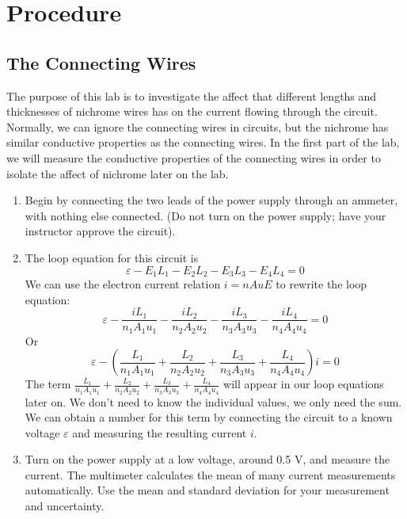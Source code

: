 \documentclass[12pt]{article}
\begin{document}
	\section*{Procedure}
		\subsection*{The Connecting Wires}
		The purpose of this lab is to investigate the affect that different lengths and thicknesses of nichrome wires has on the current flowing through the circuit. Normally, we can ignore the connecting wires in circuits, but the nichrome has similar conductive properties as the connecting wires. In the first part of the lab, we will measure the conductive properties of the connecting wires in order to isolate the affect of nichrome later on the lab.
		\begin{enumerate}
			\item Begin by connecting the two leads of the power supply through an ammeter, with nothing else connected. (Do not turn on the power supply; have your instructor approve the circuit).
			\item The loop equation for this circuit is
			\begin{equation*}
				\varepsilon-E_1L_1-E_2L_2-E_3L_3-E_4L_4=0
			\end{equation*}
			We can use the electron current relation $i=nAuE$ to rewrite the loop equation:
			\begin{equation*}
				\varepsilon-\frac{iL_1}{n_1A_1u_1}-\frac{iL_2}{n_2A_2u_2}-\frac{iL_3}{n_3A_3u_3}-\frac{iL_4}{n_4A_4u_4}=0
			\end{equation*}
			Or
			\begin{equation}
				\varepsilon - \left(\frac{L_1}{n_1A_1u_1}+\frac{L_2}{n_2A_2u_2}+\frac{L_3}{n_3A_3u_3}+\frac{L_4}{n_4A_4u_4}\right)i=0
				\label{eqn1}
			\end{equation}
			The term $\frac{L_1}{n_1A_1u_1}+\frac{L_2}{n_2A_2u_2}+\frac{L_3}{n_3A_3u_3}+\frac{L_4}{n_4A_4u_4}$ will appear in our loop equations later on. We don't need to know the individual values, we only need the sum. We can obtain a number for this term by connecting the circuit to a known voltage $\varepsilon$ and measuring the resulting current $i$.
			\item Turn on the power supply at a low voltage, around 0.5 V, and measure the current. The multimeter calculates the mean of many current measurements automatically. Use the mean and standard deviation for your measurement and uncertainty.

\end{enumerate}
\end{document}
